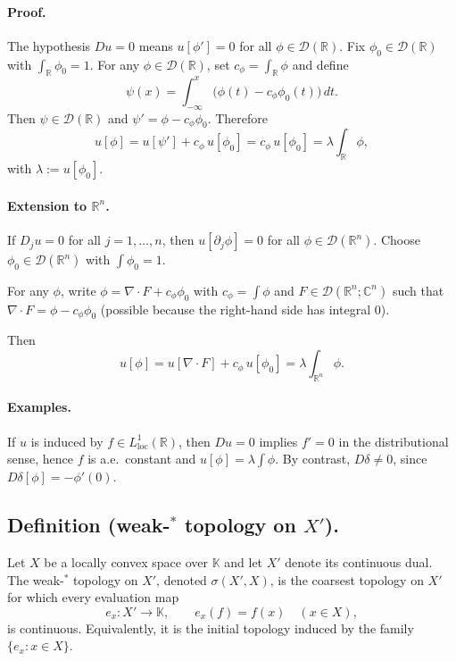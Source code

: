 \documentclass[12pt,a4paper]{article}
\theoremstyle{plain}
\theoremstyle{definition}
\theoremstyle{remark}
\theoremstyle{remark}
\begin{document}
\paragraph{Proof.}
The hypothesis \(Du=0\) means \(u[\phi']=0\) for all \(\phi\in\mathcal D(\mathbb R)\).
Fix \(\phi_0\in\mathcal D(\mathbb R)\) with \(\int_{\mathbb R}\phi_0=1\). For any \(\phi\in\mathcal D(\mathbb R)\), set \(c_\phi=\int_{\mathbb R}\phi\) and define
\[
\psi(x)=\int_{-\infty}^x\big(\phi(t)-c_\phi\phi_0(t)\big)\,dt.
\]
Then \(\psi\in\mathcal D(\mathbb R)\) and \(\psi'=\phi-c_\phi\phi_0\). Therefore
\[
u[\phi]=u[\psi']+c_\phi\,u[\phi_0]=c_\phi\,u[\phi_0]=\lambda\int_{\mathbb R}\phi,
\]
with \(\lambda:=u[\phi_0]\).

\paragraph{Extension to \(\mathbb R^n\).}
If \(D_j u=0\) for all \(j=1,\dots,n\), then \(u[\partial_j\phi]=0\) for all \(\phi\in\mathcal D(\mathbb R^n)\).
Choose \(\phi_0\in\mathcal D(\mathbb R^n)\) with \(\int\phi_0=1\).

 For any \(\phi\), write \(\phi=\nabla\cdot F+c_\phi\phi_0\) with \(c_\phi=\int\phi\) and \(F\in\mathcal D(\mathbb R^n;\mathbb C^n)\) such that \(\nabla\cdot F=\phi-c_\phi\phi_0\) (possible because the right-hand side has integral \(0\)). 
 
 Then
\[
u[\phi]=u[\nabla\cdot F]+c_\phi\,u[\phi_0]=\lambda\int_{\mathbb R^n}\phi.
\]

\paragraph{Examples.}
If \(u\) is induced by \(f\in L^1_{\mathrm{loc}}(\mathbb R)\), then \(Du=0\) implies \(f' = 0\) in the distributional sense, hence \(f\) is a.e.\ constant and \(u[\phi]=\lambda\int\phi\).
By contrast, \(D\delta\ne0\), since \(D\delta[\phi]=-\phi'(0)\).

\subsection*{Definition (weak-$^\ast$ topology on $X'$).}

Let $X$ be a locally convex space over $\mathbb K$ and let $X'$ denote its continuous dual.
The weak-$^\ast$ topology on $X'$, denoted $\sigma(X',X)$, is the coarsest topology on $X'$ for which every evaluation map
\[
e_x:X'\to\mathbb K,\qquad e_x(f)=f(x)\quad(x\in X),
\]
is continuous. Equivalently, it is the initial topology induced by the family $\{e_x:x\in X\}$.
\end{document}
